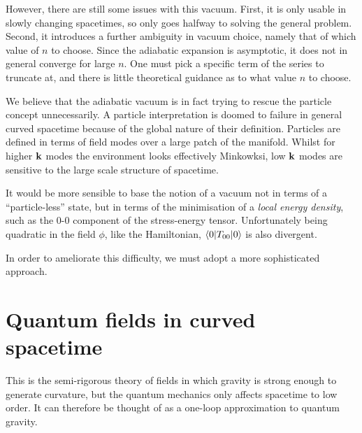 However, there are still some issues with this vacuum. First, it is only usable in slowly changing spacetimes, so only goes halfway to solving the general problem. Second, it introduces a further ambiguity in vacuum choice, namely that of which value of $n$ to choose. Since the adiabatic expansion is asymptotic, it does not in general converge for large $n$. One must pick a specific term of the series to truncate at, and there is little theoretical guidance as to what value $n$ to choose.

We believe that the adiabatic vacuum is in fact trying to rescue the particle concept unnecessarily. A particle interpretation is doomed to failure in general curved spacetime because of the global nature of their definition. Particles are defined in terms of field modes over a large patch of the manifold. Whilst for higher $\mathbf{k}$ modes the environment looks effectively Minkowksi, low $\mathbf{k}$ modes are sensitive to the large scale structure of spacetime.

It would be more sensible to base the notion of a vacuum not in terms of a ``particle-less'' state, but in terms of the minimisation of a {\em local energy density}, such as the $0$-$0$ component of the stress-energy tensor. Unfortunately being quadratic in the field $\phi$, like the Hamiltonian, $\left\langle0\middle|T_{00}\middle|0\right\rangle$ is also divergent.

In order to ameliorate this difficulty, we must adopt a more sophisticated approach. 

\section{Quantum fields in curved spacetime} 
\label{sec:QFTCST}
This is the semi-rigorous theory of fields in which gravity is strong enough to generate curvature, but the quantum mechanics only affects spacetime to low order. It can therefore be thought of as a one-loop approximation to quantum gravity.

